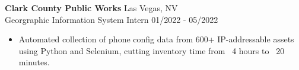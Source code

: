 
\textbf{Clark County Public Works} \hfill Las Vegas, NV \\
\textnormal{Georgraphic Information System Intern} \hfill 01/2022 - 05/2022
\begin{itemize}[leftmargin=*, nosep]
  \item Automated collection of phone config data from 600+ IP-addressable assets using Python and Selenium, cutting inventory time from ~4 hours to ~20 minutes.
\end{itemize}
